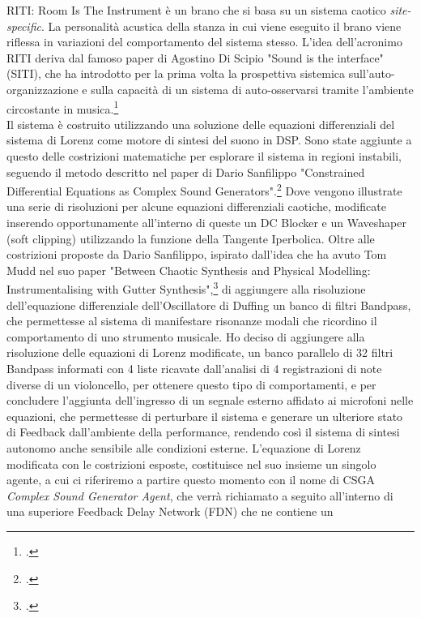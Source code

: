 RITI: Room Is The Instrument è un brano che si basa su un sistema caotico \textit{site-specific}.
La personalità acustica della stanza in cui viene eseguito il brano 
viene riflessa in variazioni del comportamento del sistema stesso.
L'idea dell'acronimo RITI deriva dal famoso paper di Agostino Di Scipio 
"Sound is the interface" (SITI), 
che ha introdotto per la prima volta la prospettiva sistemica 
sull'auto-organizzazione e sulla capacità di un sistema di auto-osservarsi 
tramite l'ambiente circostante in musica.\footcite{di_scipio_sound_2003} \\
Il sistema è costruito utilizzando una soluzione 
delle equazioni differenziali del sistema di Lorenz come motore di sintesi del suono in DSP. 
Sono state aggiunte a questo delle costrizioni matematiche
per esplorare il sistema in regioni instabili, 
seguendo il metodo descritto nel paper di Dario Sanfilippo 
"Constrained Differential Equations as Complex Sound Generators".\footcite{sanfilippo_constrained_2021} 
Dove vengono illustrate una serie di risoluzioni per alcune 
equazioni differenziali caotiche,
modificate inserendo opportunamente all'interno di queste un
DC Blocker e un Waveshaper (soft clipping) utilizzando la funzione della Tangente Iperbolica.
Oltre alle costrizioni proposte da Dario Sanfilippo, 
ispirato dall'idea che ha avuto Tom Mudd nel suo paper
"Between Chaotic Synthesis and Physical Modelling: Instrumentalising with Gutter Synthesis",\footcite{tom_mudd_gutter_synthesis}
di aggiungere alla risoluzione dell'equazione differenziale dell'Oscillatore di Duffing
un banco di filtri Bandpass, che permettesse al sistema di manifestare
risonanze modali che ricordino il comportamento di uno strumento musicale.
Ho deciso di aggiungere alla risoluzione delle equazioni di Lorenz modificate,
un banco parallelo di 32 filtri Bandpass informati 
con 4 liste ricavate dall'analisi di 4 registrazioni di note diverse di un violoncello, 
per ottenere questo tipo di comportamenti,
e per concludere l'aggiunta dell'ingresso di un segnale esterno affidato ai microfoni nelle equazioni, 
che permettesse di perturbare il sistema e generare un ulteriore stato 
di Feedback dall'ambiente della performance,
rendendo così il sistema di sintesi autonomo anche sensibile alle condizioni esterne.
L'equazione di Lorenz modificata con le costrizioni esposte,
costituisce nel suo insieme un singolo agente, a cui ci riferiremo a partire questo
momento con il nome di CSGA \textit{Complex Sound Generator Agent}, che verrà richiamato a seguito
all'interno di una superiore Feedback Delay Network (FDN) che ne contiene un 
